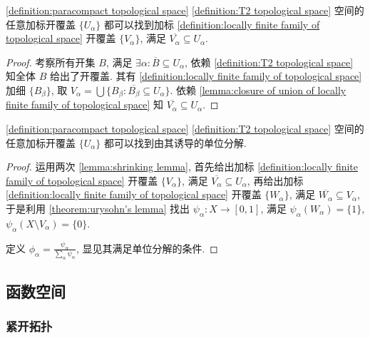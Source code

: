 \begin{lemma}[收缩引理]
    \label {lemma:shrinking lemma}
    \ref{definition:paracompact topological space} \ref{definition:T2 topological space} 空间的任意加标开覆盖 \(\{U_\alpha\}\) 都可以找到加标 \ref{definition:locally finite family of topological space}
    开覆盖 \(\{V_\alpha\}\), 满足 \(\overline{V_\alpha} \subseteq U_\alpha\).

    \begin{proof}
        考察所有开集 \(B\), 满足 \(\exists \alpha : \overline{B} \subseteq U_\alpha\), 依赖 \ref{definition:T2 topological space} 知全体 \(B\) 给出了开覆盖.
        其有 \ref{definition:locally finite family of topological space} 加细 \(\{B_\beta\}\), 取 \(V_\alpha = \bigcup \{B_\beta : \overline{B_\beta} \subseteq U_\alpha\}\).
        依赖 \ref{lemma:closure of union of locally finite family of topological space} 知 \(\overline{V_\alpha} \subseteq U_\alpha\).
    \end{proof}
\end{lemma}

\begin{theorem}[单位分解定理]
    \label {theorem:partition of unity theorem (paracompact)}
    \ref{definition:paracompact topological space} \ref{definition:T2 topological space} 空间的任意加标开覆盖 \(\{U_\alpha\}\) 都可以找到由其诱导的单位分解.

    \begin{proof}
        运用两次 \ref{lemma:shrinking lemma}, 首先给出加标 \ref{definition:locally finite family of topological space} 开覆盖 \(\{V_\alpha\}\), 满足 \(\overline{V_\alpha} \subseteq U_\alpha\),
        再给出加标 \ref{definition:locally finite family of topological space} 开覆盖 \(\{W_\alpha\}\), 满足 \(\overline{W_\alpha} \subseteq V_\alpha\), 于是利用 \ref{theorem:urysohn's lemma} 找出 \(\psi_\alpha : X \to [0,1]\),
        满足 \(\psi_\alpha (W_\alpha) = \{1\}\), \(\psi_\alpha (X \setminus V_\alpha) = \{0\}\).

        定义 \(\phi_\alpha = \frac{\psi_\alpha}{\sum_\alpha \psi_\alpha}\), 显见其满足单位分解的条件.
    \end{proof}
\end{theorem}

\subsection{函数空间}

\subsubsection{紧开拓扑}


